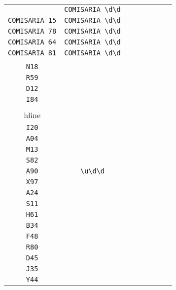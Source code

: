 \begin{longtable}{cccccccc}
\begin{tabular}{ll}
    \verb|COMISARIA 29| & \verb|COMISARIA \d\d|\\
\verb|COMISARIA 15| & \verb|COMISARIA \d\d|\\
\verb|COMISARIA 78| & \verb|COMISARIA \d\d|\\
\verb|COMISARIA 64| & \verb|COMISARIA \d\d|\\
\verb|COMISARIA 81| & \verb|COMISARIA \d\d|
\end{tabular}
\\\midrule 
\begin{tabular}{l}
    \verb|K60|\\
\verb|N18|\\
\verb|R59|\\
\verb|D12|\\
\verb|I84|\\
\\hline\\
\verb|I20|\\
\verb|A04|\\
\verb|M13|\\
\verb|S82|\\
\verb|A90|
\end{tabular}

&
\verb|\u\d\d|
&

\begin{tabular}{l}
    \verb|\u\d\d|\\
\verb|X97|\\
\verb|A24|\\
\verb|S11|\\
\verb|H61|\\
\verb|B34|
\end{tabular}

&

\begin{tabular}{l}
    \verb|\u\d\d|\\
\verb|F48|\\
\verb|R80|\\
\verb|D45|\\
\verb|J35|\\
\verb|Y44|
\end{tabular}

&


\end{longtable}
